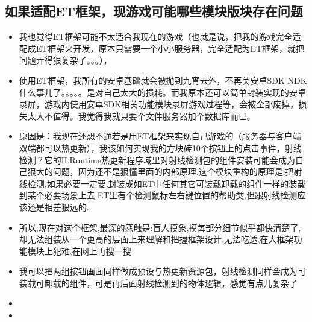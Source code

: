 \documentclass[9pt, b5paper]{article}
\begin{document}
\subsection{如果适配ET框架，现游戏可能哪些模块版块存在问题}
\label{sec-3-1}
\begin{itemize}
\item 我也觉得ET框架可能不太适合我现在的游戏（也就是说，把我的游戏完全适配成ET框架来开发，原本只需要一个小小服务器，完全适配为ET框架，就把问题弄得狠复杂了。。。），
\item 使用ET框架，我所有的安卓基础就会被抛到九宵去外，不再关安卓SDK  NDK什么事儿了。。。。。是对自己太大的损耗。而我原本还可以简单封装实现的安卓录屏，游戏内使用安卓SDK相关功能模块录屏游戏过程等，会被全部废掉，损失太大不值得。我觉得我就只要个文件服务器加个数据库而已。
\item 原因是：我现在还想不通若是用ET框架来实现自己游戏的（服务器与客户端双端都可以热更新），我该如何实现我的方块砖10个按钮上的点击事件，射线检测？它的ILRuntime热更新程序域里对射线检测包的组件安装可能会成为自己狠大的问题，因为还不是狠懂里面的内部原理.这个模块重构的原理是:把射线检测,如果必要一定要,封装成如ET中任何其它可装载卸载的组件一样的装载到某个必要场景上去.ET里有个检测鼠标左右键位置的帮助类,但跟射线检测应该还是相差狠远的.
\item 所以,现在对这个框架,最深的感触是:盲人摸象,摸每部分细节似乎都快清楚了,却无法组装从一个更高的层面上来理解和把握框架设计,无法吃透,在大框架功能模块上犯难,在网上再搜一搜
\item 我可以把两组按钮画面同样做成预设与热更新资源包，射线检测同样会成为可装载可卸载的组件，可是再后面射线检测到的物体逻辑，感觉有点儿复杂了
\item 
\item 
\end{itemize}
\end{document}
